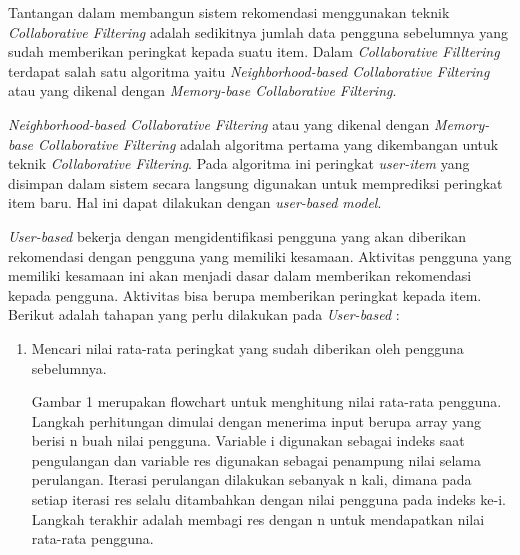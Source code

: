 \documentclass[a4paper,twoside]{article}
\begin{document}
\begin{enumerate}
	Tantangan dalam membangun sistem rekomendasi menggunakan teknik \textit{Collaborative Filtering} adalah sedikitnya jumlah data pengguna sebelumnya yang sudah memberikan peringkat kepada suatu item. Dalam \textit{Collaborative Filltering} terdapat salah satu algoritma yaitu \textit{Neighborhood-based Collaborative Filtering} atau yang dikenal dengan \textit{Memory-base Collaborative Filtering}.
	
	\textit{Neighborhood-based Collaborative Filtering} atau yang dikenal dengan \textit{Memory-base Collaborative Filtering} adalah algoritma pertama yang dikembangan untuk teknik \textit{Collaborative Filtering}. Pada algoritma ini peringkat \textit{user-item} yang disimpan dalam sistem secara langsung digunakan untuk memprediksi peringkat item baru. Hal ini dapat dilakukan dengan \textit{user-based model}. %

	\textit{User-based} bekerja dengan mengidentifikasi pengguna yang akan diberikan rekomendasi dengan pengguna yang memiliki kesamaan. Aktivitas pengguna yang memiliki kesamaan ini akan menjadi dasar dalam memberikan rekomendasi kepada pengguna. Aktivitas bisa berupa memberikan peringkat kepada item. Berikut adalah tahapan yang perlu dilakukan pada \textit{User-based} : 

\begin{enumerate}
	\item Mencari nilai rata-rata peringkat yang sudah diberikan oleh pengguna sebelumnya.
	
	Gambar 1 merupakan flowchart untuk menghitung nilai rata-rata pengguna. Langkah perhitungan dimulai dengan menerima input berupa array yang berisi n buah nilai pengguna. Variable i digunakan sebagai indeks saat pengulangan dan variable res digunakan sebagai penampung nilai selama perulangan. Iterasi perulangan dilakukan sebanyak n kali, dimana pada setiap iterasi res selalu ditambahkan dengan nilai pengguna pada indeks ke-i. Langkah terakhir adalah membagi res dengan n untuk mendapatkan nilai rata-rata pengguna. 	
	

\end{enumerate}
\end{enumerate}
\end{document}
